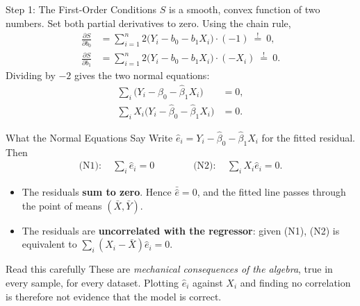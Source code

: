 \documentclass[aspectratio=169,11pt,xcolor=dvipsnames]{beamer}
\begin{document}
\begin{frame}{Step 1: The First-Order Conditions}
$S$ is a smooth, convex function of two numbers. Set both partial derivatives to
zero. Using the chain rule,
\begin{align*}
  \frac{\partial S}{\partial b_0}
  &= \sum_{i=1}^n 2\big(Y_i - b_0 - b_1X_i\big)\cdot(-1)
  \ \overset{!}{=}\ 0 ,\\[4pt]
  \frac{\partial S}{\partial b_1}
  &= \sum_{i=1}^n 2\big(Y_i - b_0 - b_1X_i\big)\cdot(-X_i)
  \ \overset{!}{=}\ 0 .
\end{align*}
Dividing by $-2$ gives the two \alert{normal equations}:
\begin{align*}
  \sum_i \big(Y_i - \hat\beta_0 - \hat\beta_1 X_i\big) &= 0 , \tag{N1}\\
  \sum_i X_i\big(Y_i - \hat\beta_0 - \hat\beta_1 X_i\big) &= 0 . \tag{N2}
\end{align*}
\end{frame}

\begin{frame}{What the Normal Equations Say}
Write $\hat e_i = Y_i - \hat\beta_0 - \hat\beta_1 X_i$ for the fitted residual. Then
\begin{align*}
  \text{(N1)}: \quad \sum_i \hat e_i = 0
  \qquad\qquad
  \text{(N2)}: \quad \sum_i X_i \hat e_i = 0 .
\end{align*}
\begin{itemize}\itemsep5pt
  \item The residuals \textbf{sum to zero}. Hence $\bar{\hat e} = 0$, and the
        fitted line passes through the point of means $(\bar X, \bar Y)$.
  \item The residuals are \textbf{uncorrelated with the regressor}: given (N1),
        (N2) is equivalent to $\sum_i (X_i - \bar X)\hat e_i = 0$.
\end{itemize}
\vskip4pt
\begin{alertblock}{Read this carefully}
These are \emph{mechanical consequences of the algebra}, true in every sample,
for every dataset. Plotting $\hat e_i$ against $X_i$ and finding no correlation
is therefore \alert{not evidence that the model is correct}.
\end{alertblock}
\end{frame}
\end{document}
